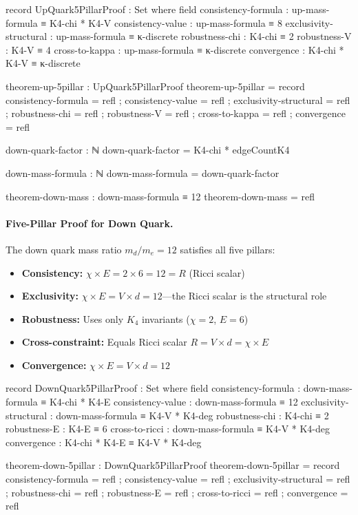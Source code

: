 \documentclass[11pt,a4paper]{book}
\begin{document}
\begin{code}
record UpQuark5PillarProof : Set where
  field
    consistency-formula : up-mass-formula ≡ K4-chi * K4-V
    consistency-value : up-mass-formula ≡ 8
    exclusivity-structural : up-mass-formula ≡ κ-discrete
    robustness-chi : K4-chi ≡ 2
    robustness-V : K4-V ≡ 4
    cross-to-kappa : up-mass-formula ≡ κ-discrete
    convergence : K4-chi * K4-V ≡ κ-discrete

theorem-up-5pillar : UpQuark5PillarProof
theorem-up-5pillar = record
  { consistency-formula = refl
  ; consistency-value = refl
  ; exclusivity-structural = refl
  ; robustness-chi = refl
  ; robustness-V = refl
  ; cross-to-kappa = refl
  ; convergence = refl
  }
\end{code}

\begin{code}
down-quark-factor : ℕ
down-quark-factor = K4-chi * edgeCountK4

down-mass-formula : ℕ
down-mass-formula = down-quark-factor

theorem-down-mass : down-mass-formula ≡ 12
theorem-down-mass = refl
\end{code}

\paragraph{Five-Pillar Proof for Down Quark.}
The down quark mass ratio $m_d/m_e = 12$ satisfies all five pillars:
\begin{itemize}
\item \textbf{Consistency:} $\chi \times E = 2 \times 6 = 12 = R$ (Ricci scalar)
\item \textbf{Exclusivity:} $\chi \times E = V \times d = 12$---the Ricci scalar is the structural role
\item \textbf{Robustness:} Uses only $K_4$ invariants ($\chi = 2$, $E = 6$)
\item \textbf{Cross-constraint:} Equals Ricci scalar $R = V \times d = \chi \times E$
\item \textbf{Convergence:} $\chi \times E = V \times d = 12$
\end{itemize}

\begin{code}
record DownQuark5PillarProof : Set where
  field
    consistency-formula : down-mass-formula ≡ K4-chi * K4-E
    consistency-value : down-mass-formula ≡ 12
    exclusivity-structural : down-mass-formula ≡ K4-V * K4-deg
    robustness-chi : K4-chi ≡ 2
    robustness-E : K4-E ≡ 6
    cross-to-ricci : down-mass-formula ≡ K4-V * K4-deg
    convergence : K4-chi * K4-E ≡ K4-V * K4-deg

theorem-down-5pillar : DownQuark5PillarProof
theorem-down-5pillar = record
  { consistency-formula = refl
  ; consistency-value = refl
  ; exclusivity-structural = refl
  ; robustness-chi = refl
  ; robustness-E = refl
  ; cross-to-ricci = refl
  ; convergence = refl
  }
\end{code}
\end{document}
